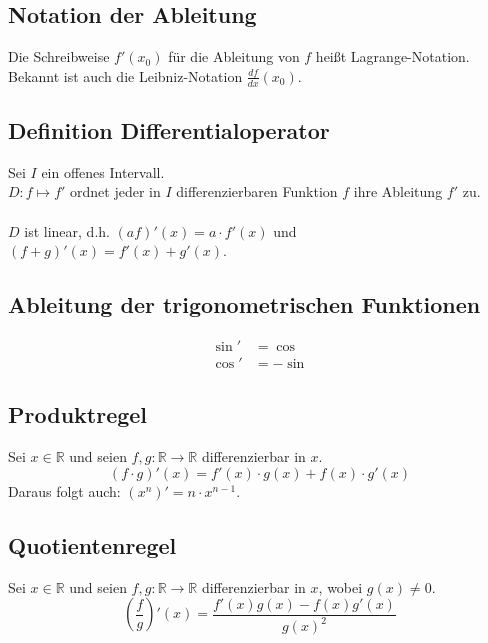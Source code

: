 \documentclass[halfparscip]{scrartcl}
\newcounter{subsection2}
\begin{document}
\subsection*{Notation der Ableitung}
Die Schreibweise $f'(x_0)$ für die Ableitung von $f$ heißt Lagrange-Notation. Bekannt ist auch die Leibniz-Notation $\frac{df}{dx}(x_0)$.

\subsection*{Definition Differentialoperator}
Sei $I$ ein offenes Intervall.\\
$D: f \mapsto f'$ ordnet jeder in $I$ differenzierbaren Funktion $f$ ihre Ableitung $f'$ zu.\\\\
$D$ ist linear, d.h. $(a f)'(x) = a \cdot f'(x)$ und $(f + g)'(x) = f'(x) + g'(x)$.

\subsection*{Ableitung der trigonometrischen Funktionen}
\begin{align*}
	\sin' &= \cos\\
	\cos' &= -\sin
\end{align*}

\addtocounter{subsection}{4}
\subsection{Produktregel}
Sei $x \in \mathbb{R}$ und seien $f, g: \mathbb{R} \rightarrow \mathbb{R}$ differenzierbar in $x$.\\
\begin{equation*}
	(f \cdot g)'(x) = f'(x)\cdot g(x) + f(x)\cdot g'(x)
\end{equation*}
Daraus folgt auch: $(x^n)' = n \cdot x^{n-1}$.

\subsection{Quotientenregel}
Sei $x \in \mathbb{R}$ und seien $f, g: \mathbb{R} \rightarrow \mathbb{R}$ differenzierbar in $x$, wobei $g(x) \neq 0$.\\
\begin{equation*}
	\left(\frac{f}{g}\right)'(x) = \frac{f'(x)g(x) - f(x)g'(x)}{g(x)^2}
\end{equation*}
\end{document}
